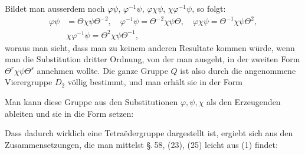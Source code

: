 Bildet man ausserdem noch $\varphi\psi$, $\varphi^{-1}\psi$, $\varphi\chi\psi$, $\chi\varphi^{-1}\psi$, so folgt:
\[
\begin{aligned}
\varphi\psi &= \Theta\chi\psi\Theta^{-2}, \quad \varphi^{-1}\psi = \Theta^{-2}\chi\psi\Theta, \quad \varphi\chi\psi = \Theta^{-1}\chi\psi\Theta^2, \\
&\chi\varphi^{-1}\psi = \Theta^2\chi\psi\Theta^{-1},
\end{aligned}
\]
woraus man sieht, dass man zu keinem anderen Resultate kommen würde, wenn man die Substitution dritter Ordnung, von der man ausgeht, in der zweiten Form $\Theta^r\chi\psi\Theta^s$ annehmen wollte. Die ganze Gruppe $Q$ ist also durch die angenommene Vierergruppe $D_2$ völlig bestimmt, und man erhält sie in der Form

Man kann diese Gruppe aus den Substitutionen $\varphi, \psi, \chi$ als den Erzeugenden ableiten und sie in die Form setzen:

Dass dadurch wirklich eine Tetra\"edergruppe dargestellt ist, ergiebt sich aus den Zusammensetzungen, die man mittelst \S.\,58, (23), (25) leicht aus (1) findet:

